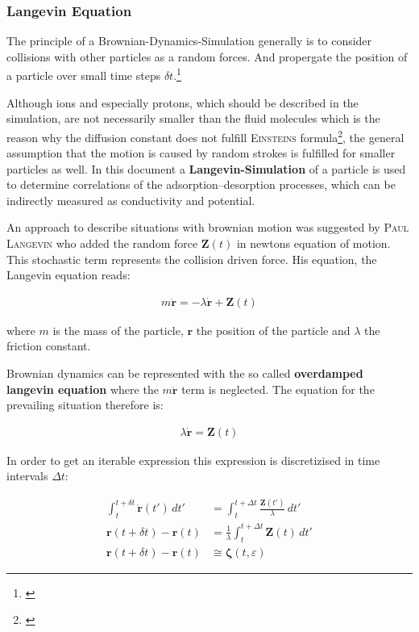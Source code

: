 \documentclass[a4paper, parskip=half]{scrartcl}
\newcommand{\person}[1]{%
	\textsc{#1}%
}
\newcommand{\effect}[1]{%
	\textbf{#1}%
}
\newcommand{\myCite}[1]{\footnote{\cite{#1} \citeauthor{#1} \citetitle{#1} \citeyear{#1}}}
\begin{document}
\subsubsection{Langevin Equation}
The principle of a Brownian-Dynamics-Simulation generally is to consider collisions with other particles as a random forces. And propergate the position of a particle over small time steps $\delta t$.\myCite{book}

Although ions and especially protons, which should be described in the simulation, are not necessarily smaller than the fluid molecules which is the reason why the diffusion constant does not fulfill \person{Einsteins} formula\myCite{brownian}, the general assumption that the motion is caused by random strokes is fulfilled for smaller particles as well. In this document a \effect{Langevin-Simulation} of a particle is used to determine correlations of the adsorption--desorption processes, which can be indirectly measured as conductivity and potential.
 
An approach to describe situations with brownian motion was suggested by \person{Paul Langevin} who added the random force $\mathbf{Z}(t)$ in newtons equation of motion. This stochastic term represents the collision driven force. His equation, the Langevin equation reads:

\begin{align}
m \ddot{\mathbf{r}} = -\lambda\dot{\mathbf{r}} + \mathbf{Z}(t)
\end{align}

where $m$ is the mass of the particle, $\mathbf{r}$ the position of the particle and $\lambda$ the friction constant.

Brownian dynamics can be represented with the so called \effect{overdamped langevin equation} where the $m \ddot{\mathbf{r}}$ term is neglected. The equation for the prevailing situation therefore is:

\begin{align}
\lambda\dot{\mathbf{r}} = \mathbf{Z}(t)
\end{align}

In order to get an iterable expression this expression is discretizised in time intervals $\Delta t$:

\begin{align}
\int_t^{t+ \delta t} \dot{\mathbf{r}}(t')\, dt' &= \int_t^{t+ \Delta t} \frac{\mathbf{Z}(t')}{\lambda}\, dt' \\
\mathbf{r}(t + \delta t) - \mathbf{r}(t) &= \frac{1}{\lambda} \int_t^{t+ \Delta t} \mathbf{Z}(t)\, dt'\\
\mathbf{r}(t + \delta t) - \mathbf{r}(t) &\cong \boldsymbol{\zeta}(t, \varepsilon)
\end{align}
\end{document}
